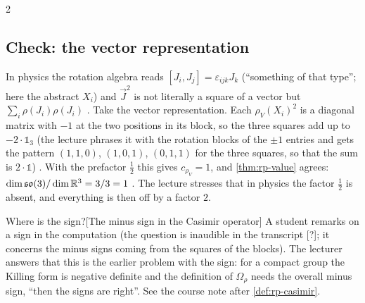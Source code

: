 \begin{paracol}{2}
\subsection{Check: the vector representation}\label{sec:rp-casimir-vec}
In physics the rotation algebra reads $[J_i,J_j]=\varepsilon_{ijk}J_k$ (``something of that type''; here the abstract $X_i$) and $\vec J^2$ is not literally a square of a vector but $\sum_i\rho(J_i)\rho(J_i)$   . Take the vector representation. Each $\rho_V(X_i)^2$ is a diagonal matrix with $-1$ at the two positions in its block, so the three squares add up to $-2\cdot\mathbb 1_3$ (the lecture phrases it with the rotation blocks of the $\pm1$ entries and gets the pattern $(1,1,0)$, $(1,0,1)$, $(0,1,1)$ for the three squares, so that the sum is $2\cdot\mathbb 1$)    . With the prefactor $\frac12$ this gives $c_{\rho_V}=1$, and \cref{thm:rp-value} agrees: $\dim\mathfrak{so}(3)/\dim\mathbb{R}^3=3/3=1$    . The lecture stresses that in physics the factor $\frac12$ is absent, and everything is then off by a factor $2$.
\begin{answer}{Where is the sign?}[The minus sign in the Casimir operator]
A student remarks on a sign in the computation (the question is inaudible in the transcript [?]; it concerns the minus signs coming from the squares of the blocks). The lecturer answers that this is the earlier problem with the sign: for a compact group the Killing form is negative definite and the definition of $\Omega_\rho$ needs the overall minus sign, ``then the signs are right''. See the course note after \cref{def:rp-casimir}.   
\end{answer}


\end{paracol}
